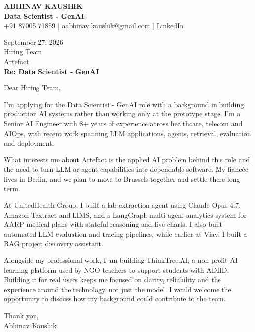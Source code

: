 \documentclass[10pt,a4paper]{article}
\begin{document}
\begin{center}
{\Large\bfseries ABHINAV KAUSHIK}\\[2pt]
{\bfseries Data Scientist - GenAI}\\[2pt]
+91 87005 71859 \quad | \quad aabhinav.kaushik@gmail.com \quad | \quad LinkedIn
\end{center}
\vspace{8pt}
September 27, 2026\\[6pt]
Hiring Team\\
Artefact\\[4pt]
\textbf{Re: Data Scientist - GenAI}

Dear Hiring Team,

I’m applying for the Data Scientist - GenAI role with a background in building production AI systems rather than working only at the prototype stage. I’m a Senior AI Engineer with 8+ years of experience across healthcare, telecom and AIOps, with recent work spanning LLM applications, agents, retrieval, evaluation and deployment.

What interests me about Artefact is the applied AI problem behind this role and the need to turn LLM or agent capabilities into dependable software. My fiancée lives in Berlin, and we plan to move to Brussels together and settle there long term.

At UnitedHealth Group, I built a lab-extraction agent using Claude Opus 4.7, Amazon Textract and LIMS, and a LangGraph multi-agent analytics system for AARP medical plans with stateful reasoning and live charts. I also built automated LLM evaluation and tracing pipelines, while earlier at Viavi I built a RAG project discovery assistant.

Alongside my professional work, I am building ThinkTree.AI, a non-profit AI learning platform used by NGO teachers to support students with ADHD. Building it for real users keeps me focused on clarity, reliability and the experience around the technology, not just the model. I would welcome the opportunity to discuss how my background could contribute to the team.

Thank you,\\
Abhinav Kaushik
\end{document}
